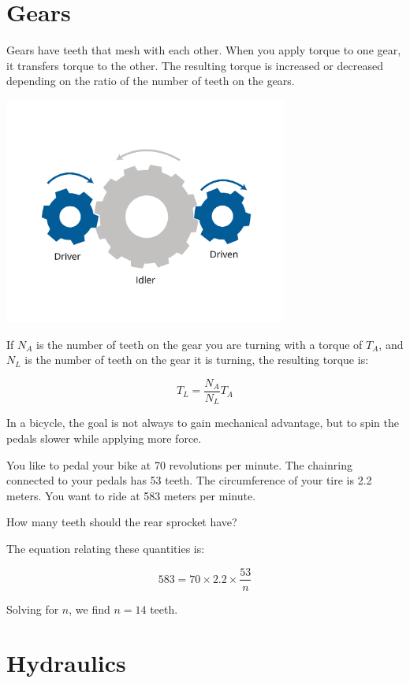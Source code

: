 \section{Gears}

Gears have teeth that mesh with each other. When you apply torque to one gear, it transfers torque to the other. The resulting torque is increased or decreased depending on the ratio of the number of teeth on the gears.

\includegraphics[width=0.7\textwidth]{gearsNew.png}

If \( N_A \) is the number of teeth on the gear you are turning with a torque of \( T_A \), and \( N_L \) is the number of teeth on the gear it is turning, the resulting torque is:

\[
T_L = \frac{N_A}{N_L} T_A
\]

\begin{Exercise}[title={Gears}, label=gear]
In a bicycle, the goal is not always to gain mechanical advantage, but to spin the pedals slower while applying more force.

You like to pedal your bike at 70 revolutions per minute. The chainring connected to your pedals has 53 teeth. The circumference of your tire is 2.2 meters. You want to ride at 583 meters per minute.

How many teeth should the rear sprocket have?
\end{Exercise}
\begin{Answer}[ref=gear]
The equation relating these quantities is:

\[
583 = 70 \times 2.2 \times \frac{53}{n}
\]

Solving for \( n \), we find \( n = 14 \) teeth.
\end{Answer}

\section{Hydraulics}

